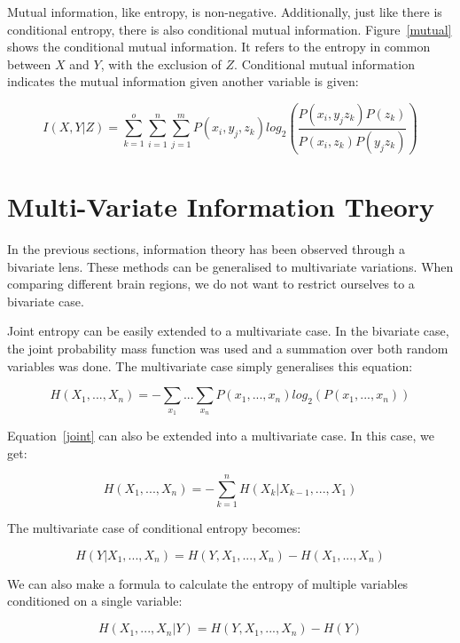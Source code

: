 Mutual information, like entropy, is non-negative. Additionally, just like there is conditional entropy, there is also conditional mutual information. Figure~\ref{mutual} shows the conditional mutual information. It refers to the entropy in common between $X$ and $Y$, with the exclusion of $Z$. Conditional mutual information indicates the mutual information given another variable is given:

\begin{equation}
I(X,Y|Z) = \sum_{k=1}^{o}\sum_{i=1}^{n}\sum_{j=1}^{m}P(x_i, y_j, z_k)log_2(\frac{P(x_i, y_j z_k)P(z_k)}{P(x_i, z_k)P(y_j z_k)})
\end{equation}

\section{Multi-Variate Information Theory}\label{multivariate}
In the previous sections, information theory has been observed through a bivariate lens. These methods can be generalised to multivariate variations. When comparing different brain regions, we do not want to restrict ourselves to a bivariate case.

Joint entropy can be easily extended to a multivariate case. In the bivariate case, the joint probability mass function was used and a summation over both random variables was done. The multivariate case simply generalises this equation:

\begin{equation}\label{multivariateentropy}
H(X_1, ..., X_n) = -\sum_{x_1}...\sum_{x_n}P(x_1,...,x_n)log_2(P(x_1,...,x_n))
\end{equation}

Equation~\ref{joint} can also be extended into a multivariate case. In this case, we get:

\begin{equation}
H(X_1, ..., X_n) = -\sum_{k=1}^{n}H(X_k|X_{k-1},...,X_1)
\end{equation}

The multivariate case of conditional entropy becomes:

\begin{equation}\label{condentropy2}
H(Y | X_1, ..., X_n) = H(Y, X_1, ..., X_n) - H(X_1, ..., X_n)
\end{equation}

We can also make a formula to calculate the entropy of multiple variables conditioned on a single variable:

\begin{equation}\label{condentropy}
H(X_1, ..., X_n | Y) = H(Y, X_1, ..., X_n) - H(Y)
\end{equation}

